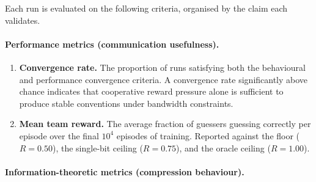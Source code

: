 \documentclass[a4paper,twoside,12pt]{report}
\begin{document}
    Each run is evaluated on the following criteria, organised by the claim
    each validates.
    
    \paragraph{Performance metrics (communication usefulness).}
    
    \begin{enumerate}
        \item \textbf{Convergence rate.} The proportion of runs satisfying
        both the behavioural and performance convergence criteria. A
        convergence rate significantly above chance indicates that cooperative
        reward pressure alone is sufficient to produce stable conventions under
        bandwidth constraints.
    
        \item \textbf{Mean team reward.} The average fraction of guessers
        guessing correctly per episode over the final $10^4$ episodes of
        training. Reported against the floor ($R = 0.50$), the single-bit
        ceiling ($R = 0.75$), and the oracle ceiling ($R = 1.00$).
    \end{enumerate}
    
    \paragraph{Information-theoretic metrics (compression behaviour).}
    
\end{document}
